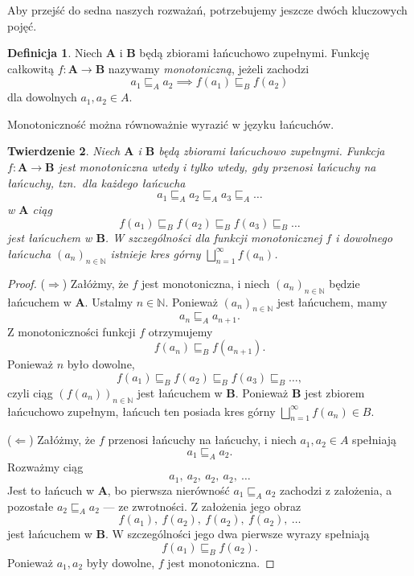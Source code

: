 \documentclass[11pt,a4paper]{article}
\theoremstyle{definition}
\newtheorem{definicja}{Definicja}[section]
\theoremstyle{plain}
\newtheorem{twierdzenie}[definicja]{Twierdzenie}
\begin{document}
Aby przejść do sedna naszych rozważań, potrzebujemy jeszcze dwóch kluczowych pojęć.

\begin{definicja}
	Niech $\boldsymbol{A}$ i $\boldsymbol{B}$ będą zbiorami łańcuchowo zupełnymi.
	Funkcję całkowitą $f : \boldsymbol{A} \to \boldsymbol{B}$ nazywamy \emph{monotoniczną}, jeżeli zachodzi
	\[
	a_1 \sqsubseteq_A a_2
	\implies
	f(a_1) \sqsubseteq_B f(a_2)
	\]
	dla dowolnych $a_1, a_2 \in A$.
\end{definicja}

Monotoniczność można równoważnie wyrazić w języku łańcuchów.

\begin{twierdzenie}\label{tw:monotoniczna_lancuchy}
	Niech $\boldsymbol{A}$ i $\boldsymbol{B}$ będą zbiorami łańcuchowo
	zupełnymi. Funkcja $f:\boldsymbol{A}\to\boldsymbol{B}$ jest monotoniczna
	wtedy i tylko wtedy, gdy przenosi łańcuchy na łańcuchy, tzn.\ dla
	każdego łańcucha
	\[
	a_1\sqsubseteq_A a_2\sqsubseteq_A a_3\sqsubseteq_A\ldots
	\]
	w $\boldsymbol{A}$ ciąg
	\[
	f(a_1)\sqsubseteq_B f(a_2)\sqsubseteq_B f(a_3)\sqsubseteq_B\ldots
	\]
	jest łańcuchem w $\boldsymbol{B}$. W szczególności dla funkcji
	monotonicznej $f$ i dowolnego łańcucha $(a_n)_{n\in\mathbb N}$ istnieje
	kres górny $\bigsqcup_{n=1}^{\infty}f(a_n)$.
\end{twierdzenie}

\begin{proof}
	($\Rightarrow$) Załóżmy, że $f$ jest monotoniczna, i niech
	$(a_n)_{n\in\mathbb N}$ będzie łańcuchem w $\boldsymbol{A}$. Ustalmy
	$n\in\mathbb N$. Ponieważ $(a_n)_{n\in\mathbb N}$ jest łańcuchem, mamy
	\[
	a_n\sqsubseteq_A a_{n+1}.
	\]
	Z monotoniczności funkcji $f$ otrzymujemy
	\[
	f(a_n)\sqsubseteq_B f(a_{n+1}).
	\]
	Ponieważ $n$ było dowolne,
	\[
	f(a_1)\sqsubseteq_B f(a_2)\sqsubseteq_B f(a_3)\sqsubseteq_B\ldots,
	\]
	czyli ciąg $(f(a_n))_{n\in\mathbb N}$ jest łańcuchem w $\boldsymbol{B}$.
	Ponieważ $\boldsymbol{B}$ jest zbiorem łańcuchowo zupełnym, łańcuch ten
	posiada kres górny $\bigsqcup_{n=1}^{\infty}f(a_n)\in B$.
	
	($\Leftarrow$) Załóżmy, że $f$ przenosi łańcuchy na łańcuchy, i niech
	$a_1,a_2\in A$ spełniają
	\[
	a_1\sqsubseteq_A a_2.
	\]
	Rozważmy ciąg
	\[
	a_1,\ a_2,\ a_2,\ a_2,\ \ldots
	\]
	Jest to łańcuch w $\boldsymbol{A}$, bo pierwsza nierówność
	$a_1\sqsubseteq_A a_2$ zachodzi z założenia, a pozostałe
	$a_2\sqsubseteq_A a_2$ --- ze zwrotności. Z założenia jego obraz
	\[
	f(a_1),\ f(a_2),\ f(a_2),\ f(a_2),\ \ldots
	\]
	jest łańcuchem w $\boldsymbol{B}$. W szczególności jego dwa pierwsze
	wyrazy spełniają
	\[
	f(a_1)\sqsubseteq_B f(a_2).
	\]
	Ponieważ $a_1,a_2$ były dowolne, $f$ jest monotoniczna.
\end{proof}
\end{document}
